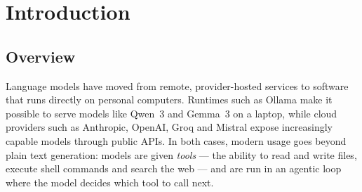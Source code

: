 \documentclass[12pt,a4paper,oneside]{report}
\begin{document}
\normalfont
\fontsize{12}{18}\selectfont


\setcounter{page}{1}
\pagestyle{plain}
\begin{singlespace}
\renewcommand{\contentsname}{Table of Contents}
\tableofcontents
\clearpage
\renewcommand{\listfigurename}{List of Figures}
\listoffigures
{}
\clearpage
\renewcommand{\listtablename}{List of Tables}
\listoftables
{}
\clearpage
\end{singlespace}

\setcounter{page}{1}
\pagestyle{orbmain}

\chapter{Introduction}

\section{Overview}
Language models have moved from remote, provider-hosted services to
software that runs directly on personal computers. Runtimes such as
Ollama make it possible to serve models like Qwen~3 and Gemma~3 on a
laptop, while cloud providers such as Anthropic, OpenAI, Groq and
Mistral expose increasingly capable models through public APIs. In
both cases, modern usage goes beyond plain text generation: models are
given \emph{tools} --- the ability to read and write files, execute
shell commands and search the web --- and are run in an agentic loop
where the model decides which tool to call next.
\end{document}
